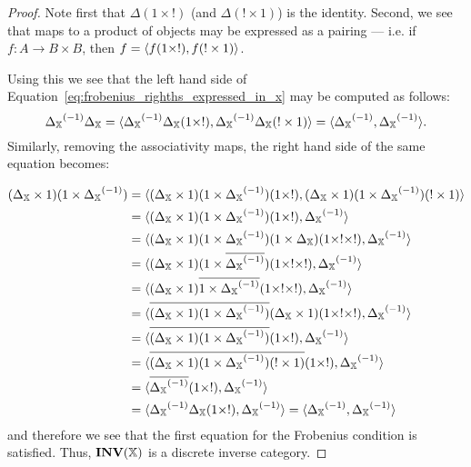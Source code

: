 \begin{proof}
  Note first that $\Delta(1 \times !)$ (and $\Delta(!\times 1)$) is the identity. Second, we see
  that maps to a product of objects may be expressed as a pairing --- i.e.  if
  $f:A \to B \times B$, then $f = \langle f(1\times !), f(!\times 1)\rangle$.

  Using this we see that the left hand side of Equation~\ref{eq:frobenius_righths_expressed_in_x}
  may be computed as follows:
  \[
    {\Delta_{\mathbb{X}}}^{(-1)} \Delta_{\mathbb{X}}
       = \langle{\Delta_{\ensuremath{\mathbb{X}}}}^{(-1)} \Delta_{\mathbb{X}}(1\times !), {\Delta_{\mathbb{X}}}^{(-1)} \Delta_{\mathbb{X}} (! \times 1)\rangle
    = \langle{\Delta_{\ensuremath{\mathbb{X}}}}^{(-1)}, {\Delta_{\mathbb{X}}}^{(-1)} \rangle.
  \]
  Similarly, removing the associativity maps, the right hand side of the same equation becomes:

  \begin{align*}
    (\Delta_{\X} \times 1) (1\times\inv{\Delta_{\X}}) &
      = \<(\Delta_{\X} \times 1) (1\times\inv{\Delta_{\X}}) (1\times !),
      (\Delta_{\X} \times 1) (1\times\inv{\Delta_{\X}}) (! \times 1 )\> \\
    &= \<(\Delta_{\X} \times 1) (1\times\inv{\Delta_{\X}}) (1\times ! ), \inv{\Delta_{\X}}\> \\
    &= \<(\Delta_{\X} \times 1) (1\times\inv{\Delta_{\X}}) (1 \times \Delta_{\X})(1\times !\times !), \inv{\Delta_{\X}}\> \\
    &= \<(\Delta_{\X} \times 1) (1\times\rst{\inv{\Delta_{\X}}}) (1\times !\times !), \inv{\Delta_{\X}}\> \\
    &= \<(\Delta_{\X} \times 1) \rst{1\times\inv{\Delta_{\X}}} (1\times !\times !), \inv{\Delta_{\X}}\> \\
    &= \<\rst{(\Delta_{\X} \times 1) (1\times\inv{\Delta_{\X}})}
      (\Delta_{\X} \times 1)(1\times !\times !), \inv{\Delta_{\X}}\> \\ %
    &= \<\rst{(\Delta_{\X} \times 1) (1\times\inv{\Delta_{\X}})} (1\times !), \inv{\Delta_{\X}}\> \\
      &= \<\rst{(\Delta_{\X} \times 1) (1\times\inv{\Delta_{\X}})(! \times 1)} (1\times !),
      \inv{\Delta_{\X}}\> \\ %
    &= \<\rst{\inv{\Delta_{\X}}} (1\times !), \inv{\Delta_{\X}}\> \\
    &= \<\inv{\Delta_{\X}}\Delta_{\X}(1\times !), \inv{\Delta_{\X}}\> = \<\inv{\Delta_{\X}}, \inv{\Delta_{\X}}\>
  \end{align*}
  and therefore we see that the first equation for the Frobenius condition is satisfied. Thus,
  $\mathbf{INV}({\mathbb{X}})$ is a discrete inverse category.
\end{proof}

